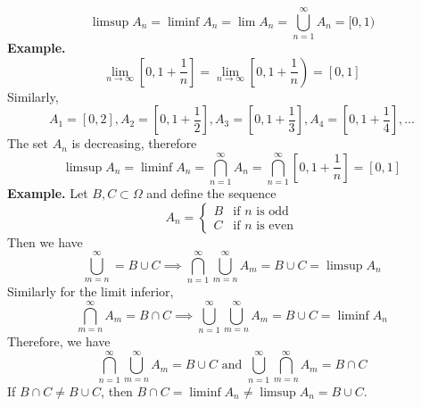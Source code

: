 \documentclass[openany]{report}
\begin{document}
\[\limsup A_n = \liminf A_n = \lim A_n = \bigcup_{n=1}^\infty A_n = [0,1)\]
\textbf{Example.}
\[\lim_{n\rightarrow\infty} \left[0, 1 + \frac{1}{n}\right] = \lim_{n\rightarrow\infty} \left[0, 1 + \frac{1}{n}\right) = [0,1]\]
Similarly,
\[A_1 = [0,2], A_2 = \left[0,1 + \frac{1}{2}\right], A_3 = \left[0,1 + \frac{1}{3}\right],A_4 = \left[0,1 + \frac{1}{4}\right], \ldots \]
The set $A_n$ is decreasing, therefore
\[\limsup A_n = \liminf A_n =\bigcap_{n=1}^\infty A_n = \bigcap_{n=1}^\infty \left[0, 1 + \frac{1}{n}\right] = [0,1]\]
\noindent
\textbf{Example.} Let $B, C \subset \Omega$ and define the sequence 
\[A_n = \begin{cases}
    B & \text{if } n \text{ is odd}\\
    C & \text{if } n \text{ is even}
\end{cases}\]
Then we have 
\[\bigcup_{m=n}^\infty = B \cup C \implies \bigcap_{n=1}^\infty \bigcup_{m=n}^\infty A_m = B \cup C = \limsup A_n\]
Similarly for the limit inferior, 
\[\bigcap_{m=n}^\infty A_m = B \cap C \implies \bigcup_{n=1}^\infty \bigcup_{m=n}^\infty A_m = B \cup C = \liminf A_n\]
Therefore, we have 
\[\bigcap_{n=1}^\infty \bigcup_{m=n}^\infty A_m = B \cup C \text{ and } \bigcup_{n=1}^\infty \bigcap_{m=n}^\infty A_m = B \cap C\]
If $B \cap C \neq B \cup C$, then $B \cap C = \liminf A_n \neq \limsup A_n = B \cup C$. 
\end{document}
